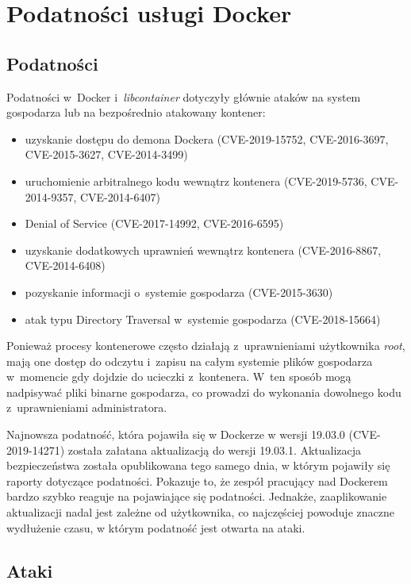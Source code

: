 \section{Podatności usługi Docker}

\subsection{Podatności}

Podatności w~Docker i~\textit{libcontainer} dotyczyły głównie ataków na system gospodarza lub na bezpośrednio atakowany kontener:

\begin{itemize}
    \item uzyskanie dostępu do demona Dockera (CVE-2019-15752, CVE-2016-3697, CVE-2015-3627, CVE-2014-3499)
    \item uruchomienie arbitralnego kodu wewnątrz kontenera (CVE-2019-5736, CVE-2014-9357, CVE-2014-6407)
    \item Denial of Service (CVE-2017-14992, CVE-2016-6595)
    \item uzyskanie dodatkowych uprawnień wewnątrz kontenera (CVE-2016-8867, CVE-2014-6408)
    \item pozyskanie informacji o~systemie gospodarza (CVE-2015-3630)
    \item atak typu Directory Traversal w~systemie gospodarza (CVE-2018-15664)
\end{itemize}

Ponieważ procesy kontenerowe często działają z~uprawnieniami użytkownika \textit{root}, mają one dostęp do odczytu i~zapisu na całym systemie plików gospodarza w~momencie gdy dojdzie do ucieczki z~kontenera. W~ten sposób mogą nadpisywać pliki binarne gospodarza, co prowadzi do wykonania dowolnego kodu z~uprawnieniami administratora.

Najnowsza podatność, która pojawiła się w Dockerze w wersji 19.03.0 (CVE-2019-14271) została załatana aktualizacją do wersji 19.03.1. Aktualizacja bezpieczeństwa została opublikowana tego samego dnia, w którym pojawiły się raporty dotyczące podatności. Pokazuje to, że zespół pracujący nad Dockerem bardzo szybko reaguje na pojawiające się podatności. Jednakże, zaaplikowanie aktualizacji nadal jest zależne od użytkownika, co najczęściej powoduje znaczne wydłużenie czasu, w którym podatność jest otwarta na ataki.

\subsection{Ataki}

